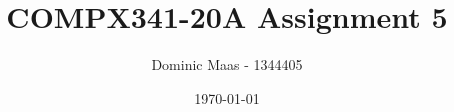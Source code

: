 \documentclass{report}
\begin{document}
\title{COMPX341-20A Assignment 5}
\author{Dominic Maas - 1344405}
\date{\today}

\maketitle

\pagebreak

\tableofcontents
\end{document}
